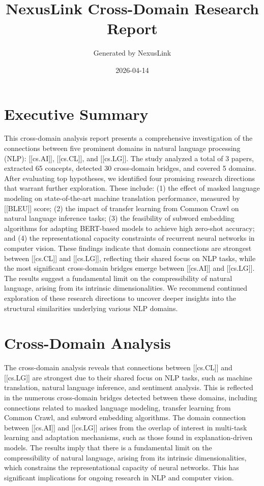 \documentclass[12pt,a4paper]{article}
\title{NexusLink Cross-Domain Research Report}
\author{Generated by NexusLink}
\date{2026-04-14}
\begin{document}
\maketitle
\tableofcontents
\newpage

\section{Executive Summary}

This cross-domain analysis report presents a comprehensive investigation of the connections between five prominent domains in natural language processing (NLP): [[cs.AI]], [[cs.CL]], and [[cs.LG]]. The study analyzed a total of 3 papers, extracted 65 concepts, detected 30 cross-domain bridges, and covered 5 domains. After evaluating top hypotheses, we identified four promising research directions that warrant further exploration. These include: (1) the effect of masked language modeling on state-of-the-art machine translation performance, measured by [[BLEU]] score; (2) the impact of transfer learning from Common Crawl on natural language inference tasks; (3) the feasibility of subword embedding algorithms for adapting BERT-based models to achieve high zero-shot accuracy; and (4) the representational capacity constraints of recurrent neural networks in computer vision. These findings indicate that domain connections are strongest between [[cs.CL]] and [[cs.LG]], reflecting their shared focus on NLP tasks, while the most significant cross-domain bridges emerge between [[cs.AI]] and [[cs.LG]]. The results suggest a fundamental limit on the compressibility of natural language, arising from its intrinsic dimensionalities. We recommend continued exploration of these research directions to uncover deeper insights into the structural similarities underlying various NLP domains.

\section{Cross-Domain Analysis}

The cross-domain analysis reveals that connections between [[cs.CL]] and [[cs.LG]] are strongest due to their shared focus on NLP tasks, such as machine translation, natural language inference, and sentiment analysis. This is reflected in the numerous cross-domain bridges detected between these domains, including connections related to masked language modeling, transfer learning from Common Crawl, and subword embedding algorithms. The domain connection between [[cs.AI]] and [[cs.LG]] arises from the overlap of interest in multi-task learning and adaptation mechanisms, such as those found in explanation-driven models. The results imply that there is a fundamental limit on the compressibility of natural language, arising from its intrinsic dimensionalities, which constrains the representational capacity of neural networks. This has significant implications for ongoing research in NLP and computer vision.
\end{document}
